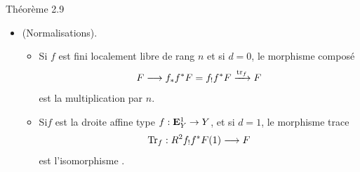 \documentclass[10pt]{../fichiers-configuration-latex/smfart}
\begin{document}
\begin{enonce*}{Théorème 2.9}
\begin{itemize}
\item[(Var 4)] (Normalisations).
\begin{itemize}
\item[(I)] Si $f$ est fini localement libre de rang $n$ et si $d=0$,
le morphisme composé
$$
F\longrightarrow
f_{\ast}f^{\ast}F=f_{!}f^{\ast}F\xrightarrow{\operatorname{tr}_{f}}F
$$
est la multiplication par $n$.

\item[(II)] Si\pageoriginale $f$ est la droite affine type
$f:\mathbf{E}^{1}_{Y}\rightarrow Y$, et si $d=1$, le morphisme trace
$$
\operatorname{Tr}_{f}: R^{2}f_{!}f^{\ast}F(1)\longrightarrow F
$$
est l'isomorphisme .
\end{itemize}
\end{itemize}
\end{enonce*}
\end{document}
